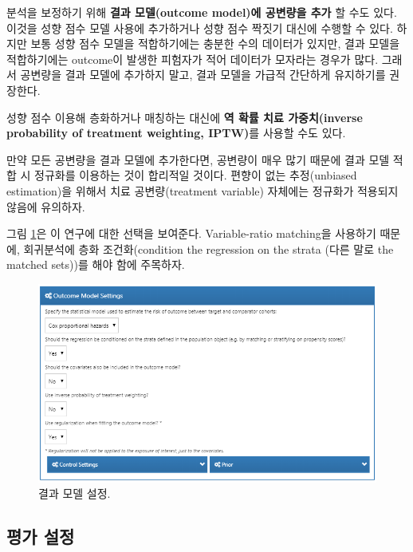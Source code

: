 \documentclass[11pt]{book}
\theoremstyle{definition}
\theoremstyle{definition}
\theoremstyle{definition}
\theoremstyle{remark}
\begin{document}
분석을 보정하기 위해 \textbf{결과 모델(outcome model)에 공변량을 추가}
할 수도 있다. 이것을 성향 점수 모델 사용에 추가하거나 성향 점수 짝짓기
대신에 수행할 수 있다. 하지만 보통 성향 점수 모델을 적합하기에는 충분한
수의 데이터가 있지만, 결과 모델을 적합하기에는 outcome이 발생한 피험자가
적어 데이터가 모자라는 경우가 많다. 그래서 공변량을 결과 모델에 추가하지
말고, 결과 모델을 가급적 간단하게 유지하기를 권장한다.

성향 점수 이용해 층화하거나 매칭하는 대신에 \textbf{역 확률 치료
가중치(inverse probability of treatment weighting, IPTW)}를 사용할 수도
있다.

만약 모든 공변량을 결과 모델에 추가한다면, 공변량이 매우 많기 때문에
결과 모델 적합 시 정규화를 이용하는 것이 합리적일 것이다. 편향이 없는
추정(unbiased estimation)을 위해서 치료 공변량(treatment variable)
자체에는 정규화가 적용되지 않음에 유의하자.

그림 \ref{fig:outcomeModelSettings}은 이 연구에 대한 선택을 보여준다.
Variable-ratio matching을 사용하기 때문에, 회귀분석에 층화
조건화(condition the regression on the strata (다른 말로 the matched
sets))를 해야 함에 주목하자.

\begin{figure}

{\centering \includegraphics[width=1\linewidth]{images/PopulationLevelEstimation/outcomeModelSettings} 

}

\caption{결과 모델 설정.}\label{fig:outcomeModelSettings}
\end{figure}

\subsection{평가 설정}\label{evaluationSettings}
\end{document}
